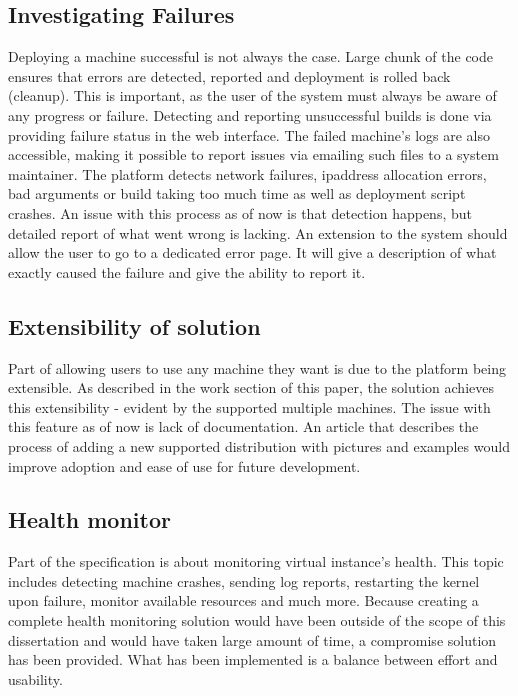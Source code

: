 \documentclass{article}
\begin{document}
\subsection{Investigating Failures}
Deploying a machine successful is not always the case. Large chunk of the code ensures that errors are detected, reported and deployment is rolled back (cleanup). This is important, as the user of the system must always be aware of any progress or failure.
Detecting and reporting unsuccessful builds is done via providing failure status in the web interface. The failed machine's logs are also accessible, making it possible to report issues via emailing such files to a system maintainer. The platform detects network failures, \gls{ipaddress} allocation errors, bad arguments or build taking too much time as well as deployment script crashes. 
An issue with this process as of now is that detection happens, but detailed report of what went wrong is lacking. An extension to the system should allow the user to go to a dedicated error page. It will give a description of what exactly caused the failure and give the ability to report it.
  
\subsection{Extensibility of solution}
Part of allowing users to use any machine they want is due to the platform being extensible. As described in the work section of this paper, the solution achieves this extensibility - evident by the supported multiple machines. 
The issue with this feature as of now is lack of documentation. An article that describes the process of adding a new supported distribution with pictures and examples would  improve adoption and ease of use for future development.

\subsection{Health monitor}
Part of the specification is about monitoring virtual instance's health. This topic includes detecting machine crashes, sending log reports, restarting the \gls{kernel} upon failure, monitor available resources and much more. Because creating a complete health monitoring solution would have been outside of the scope of this dissertation and would have taken large amount of time, a compromise solution has been provided. What has been implemented is a balance between effort and usability. 
\end{document}
